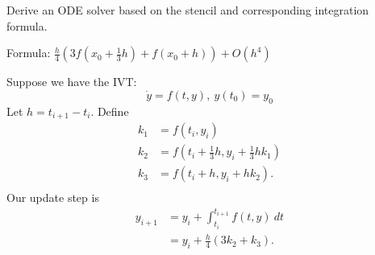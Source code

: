 \documentclass{eh-homework}
\begin{document}
    \begin{question}{5}
        Derive an ODE solver based on the stencil and corresponding integration formula.

        Formula: \(\frac{h}{4}\left( 3f \left( x_0 + \frac{1}{3}h \right) + f(x_0 + h) \right) + O (h^4)\)

        \medskip

        Suppose we have the IVT:
        \[
            \dot y = f(t,y),\ y(t_0) = y_0
        \]
        Let \(h = t_{i+1} - t_i\). Define
        \begin{align*}
            k_1 &= f(t_i, y_i) \\
            k_2 &= f \left( t_i + \frac{1}{3}h, y_i + \frac{1}{3}hk_1 \right) \\
            k_3 &= f (t_i + h, y_i + hk_2). \\
        \end{align*}
        Our update step is
        \begin{align*}
            y_{i+1} &= y_i + \int _{t_i}^{t_{i+1}}f(t,y)\ dt \\
            &= y_i + \frac{h}{4}(3k_2 + k_3).
        \end{align*}
    \end{question}
\end{document}
